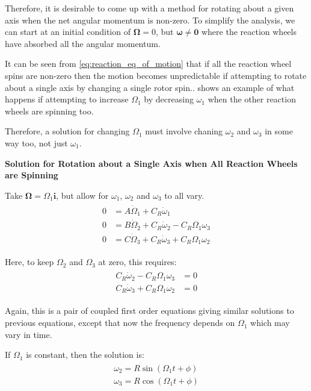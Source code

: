\documentclass[12]{article}
\begin{document}
\begin{multicols*}{2}
Therefore, it is desirable to come up with a method for rotating about a given axis when the net angular momentum is non-zero. To simplify the analysis, we can start at an initial condition of $\bm{\Omega}=0$, but $\bm{\omega} \neq \bm{0}$ where the reaction wheels have absorbed all the angular momentum.

It can be seen from \cref{eq:reaction_eq_of_motion} that if all the reaction wheel spins are non-zero then the motion becomes unpredictable if attempting to rotate about a single axis by changing a single rotor spin..  shows an example of what happens if attempting to increase $\Omega_1$ by decreasing $\omega_1$ when the other reaction wheels are spinning too.

Therefore, a solution for changing $\Omega_1$ must involve chaning $\omega_2$ and $\omega_3$ in some way too, not just $\omega_1$.

\vfill\null
\columnbreak

\textbf{Solution for Rotation about a Single Axis when All Reaction Wheels are Spinning}

Take $\bm{\Omega} = \Omega_1\bm{i}$, but allow for $\omega_1$, $\omega_2$ and $\omega_3$ to all vary.
\begin{align} \label{eq:reaction_smart_eq_of_motion}
\begin{split}
0 &= A\dot{\Omega}_1 + C_R\dot{\omega}_1 \\
0 &= B\dot{\Omega}_2 + C_R\dot{\omega}_2 - C_R\Omega_1\omega_3 \\
0 &= C\dot{\Omega}_3 + C_R\dot{\omega}_3 + C_R\Omega_1\omega_2
\end{split}
\end{align}

Here, to keep $\Omega_2$ and $\Omega_3$ at zero, this requires:
\begin{align} \label{eq:reaction_smart_condition}
\begin{split}
C_R\dot{\omega}_2 - C_R\Omega_1\omega_3 &= 0 \\
C_R\dot{\omega}_3 + C_R\Omega_1\omega_2 &= 0
\end{split}
\end{align}

Again, this is a pair of coupled first order equations giving similar solutions to previous equations, except that now the frequency depends on $\Omega_1$ which may vary in time.

If $\Omega_1$ is constant, then the solution is:
\begin{align} \label{eq:reaction_smart_solution1}
\begin{split}
\omega_2 = R\sin{(\Omega_1 t + \phi)} \\
\omega_3 = R\cos{(\Omega_1 t + \phi)}
\end{split}
\end{align}


\end{multicols*}
\end{document}
